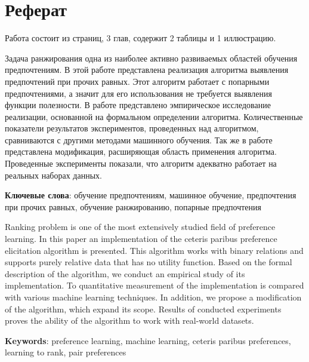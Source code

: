 \chapter*{Реферат}

Работа состоит из \pageref{LastPage} страниц, 3 глав, содержит 2 таблицы и 1 иллюстрацию. 

\vspace{2em}

Задача ранжирования одна из наиболее активно развиваемых областей обучения предпочтениям. В этой работе представлена реализация алгоритма выявления предпочтений при прочих равных. Этот алгоритм работает с попарными предпочтениями, а значит для его использования не требуется выявления функции полезности. В работе представлено эмпирическое исследование реализации, основанной на формальном определении алгоритма. Количественные показатели результатов экспериментов, проведенных над алгоритмом, сравниваются с другими методами машинного обучения. Так же в работе представлена модификация, расширяющая область применения алгоритма. Проведенные эксперименты показали, что алгоритм адекватно работает на реальных наборах данных.

\textbf{Ключевые слова}: обучение предпочтениям, машинное обучение, предпочтения при прочих равных, обучение ранжированию, попарные предпочтения 


\vspace{2em}


Ranking problem is one of the most extensively studied field of preference learning. In this paper an implementation of the ceteris paribus preference elicitation algorithm is presented. This algorithm works with binary relations and supports purely relative data that has no utility function. Based on the formal description of the algorithm, we conduct an empirical study of its implementation. To quantitative measurement of the implementation is compared with various machine learning techniques. In addition, we propose a modification of the algorithm, which expand its scope. Results of conducted experiments proves the ability of the algorithm to work with real-world datasets.

\textbf{Keywords}: preference learning, machine learning, ceteris paribus preferences, learning to rank, pair preferences
